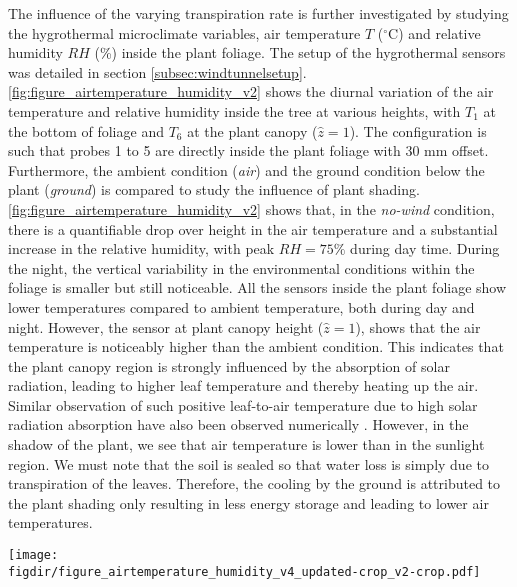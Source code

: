The influence of the varying transpiration rate is further investigated by studying the hygrothermal microclimate variables, air temperature $T$ ($^{\circ}$C) and relative humidity $\textit{RH}$ (\%) inside the plant foliage. The setup of the hygrothermal sensors was detailed in section \cref{subsec:windtunnelsetup}.  \cref{fig:figure_airtemperature_humidity_v2} shows the diurnal variation of the air temperature and relative humidity inside the tree at various heights, with $T_1$ at the bottom of foliage and $T_6$ at the plant canopy ($\hat{z}=1$). The configuration is such that probes 1 to 5 are directly inside the plant foliage with $30$ mm offset. Furthermore, the ambient condition (\textit{air}) and the ground condition below the plant (\textit{ground}) is compared to study the influence of plant shading. \cref{fig:figure_airtemperature_humidity_v2} shows that, in the \textit{no-wind} condition, there is a quantifiable drop over height in the air temperature and a substantial increase in the relative humidity, with peak $\textit{RH}=75\%$ during day time. During the night, the vertical variability in the environmental conditions within the foliage is smaller but still noticeable. All the sensors inside the plant foliage show lower temperatures compared to ambient temperature, both during day and night. However, the sensor at plant canopy height ($\hat{z}=1$), shows that the air temperature is noticeably higher than the ambient condition. This indicates that the plant canopy region is strongly influenced by the absorption of solar radiation, leading to higher leaf temperature and thereby heating up the air. Similar observation of such positive leaf-to-air temperature due to high solar radiation absorption have also been observed numerically \citep{Manickathan2018a}. However, in the shadow of the plant, we see that air temperature is lower than in the sunlight region. We must note that the soil is sealed so that water loss is simply due to transpiration of the leaves. Therefore, the cooling by the ground is attributed to the plant shading only resulting in less energy storage and leading to lower air temperatures. 

\begin{sidewaysfigure}[p]
	\centering
	\texttt{[image: \\figdir/figure\_airtemperature\_humidity\_v4\_updated-crop\_v2-crop.pdf]}
	\caption{Diurnal variation of air temperature $T$ ($^{\circ}$C) and relative humidity $RH$ (\%) inside the tree at varying heights for two wind conditions:  \textit{no wind} and  \textit{wind} ($U_{ref}=1$ m\,s$^{-1}$).}
	\label{fig:figure_airtemperature_humidity_v2}
\end{sidewaysfigure}

